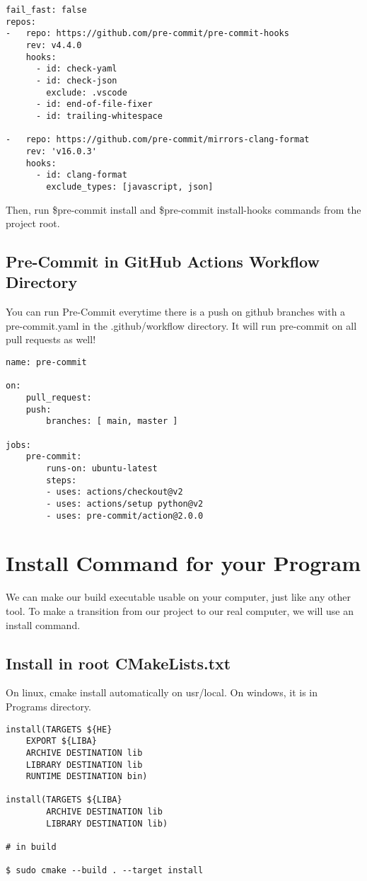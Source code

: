 \begin{verbatim}
fail_fast: false
repos:
-   repo: https://github.com/pre-commit/pre-commit-hooks
    rev: v4.4.0
    hooks:
      - id: check-yaml
      - id: check-json
        exclude: .vscode
      - id: end-of-file-fixer
      - id: trailing-whitespace

-   repo: https://github.com/pre-commit/mirrors-clang-format
    rev: 'v16.0.3'
    hooks:
      - id: clang-format
        exclude_types: [javascript, json]
\end{verbatim}

Then, run \$pre-commit install and \$pre-commit install-hooks commands from the project root.


\subsection{Pre-Commit in GitHub Actions Workflow Directory}

You can run Pre-Commit everytime there is a push on github branches with a pre-commit.yaml in the .github/workflow 
directory. It will run pre-commit on all pull requests as well!

\begin{verbatim}
name: pre-commit

on:
    pull_request:
    push:
        branches: [ main, master ]

jobs:
    pre-commit:
        runs-on: ubuntu-latest
        steps:
        - uses: actions/checkout@v2
        - uses: actions/setup python@v2
        - uses: pre-commit/action@2.0.0
\end{verbatim}


\section{Install Command for your Program}

We can make our build executable usable on your computer, just like any other tool. To make a transition from 
our project to our real computer, we will use an install command.


\subsection{Install in root CMakeLists.txt}

On linux, cmake install automatically on usr/local. On windows, it is in Programs directory.

\begin{verbatim}
install(TARGETS ${HE}
    EXPORT ${LIBA}
    ARCHIVE DESTINATION lib
    LIBRARY DESTINATION lib
    RUNTIME DESTINATION bin) 

install(TARGETS ${LIBA}
        ARCHIVE DESTINATION lib
        LIBRARY DESTINATION lib)

# in build

$ sudo cmake --build . --target install
\end{verbatim}


